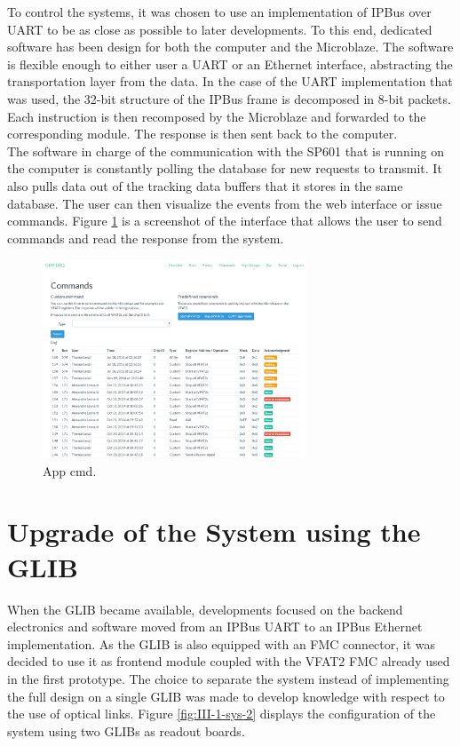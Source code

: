       To control the systems, it was chosen to use an implementation of IPBus over UART to be as close as possible to later developments. To this end, dedicated software has been design for both the computer and the Microblaze. The software is flexible enough to either user a UART or an Ethernet interface, abstracting the transportation layer from the data. In the case of the UART implementation that was used, the 32-bit structure of the IPBus frame is decomposed in 8-bit packets. Each instruction is then recomposed by the Microblaze and forwarded to the corresponding module. The response is then sent back to the computer. \\

      The software in charge of the communication with the SP601 that is running on the computer is constantly polling the database for new requests to transmit. It also pulls data out of the tracking data buffers that it stores in the same database. The user can then visualize the events from the web interface or issue commands. Figure \ref{fig:III-1-app-cmd} is a screenshot of the interface that allows the user to send commands and read the response from the system.

      \begin{figure}[h!]
        \centering
        \includegraphics[width=0.7\textwidth]{img/III-1-arch/app-cmd.png}
        \caption{App cmd.}
        \label{fig:III-1-app-cmd}
      \end{figure}

  \section{Upgrade of the System using the GLIB}

    When the GLIB became available, developments focused on the backend electronics and software moved from an IPBus UART to an IPBus Ethernet implementation. As the GLIB is also equipped with an FMC connector, it was decided to use it as frontend module coupled with the VFAT2 FMC already used in the first prototype. The choice to separate the system instead of implementing the full design on a single GLIB was made to develop knowledge with respect to the use of optical links. Figure \ref{fig:III-1-sys-2} displays the configuration of the system using two GLIBs as readout boards. \\

